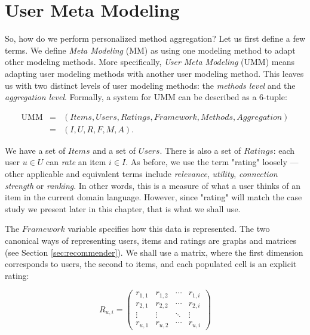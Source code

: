 \section{User Meta Modeling}

So, how do we perform personalized method aggregation?
Let us first define a few terms.
We define \emph{Meta Modeling} (MM) as using one modeling method to adapt other modeling methods.
More specifically, \emph{User Meta Modeling} (UMM) means adapting user modeling methods with another user modeling method.
This leaves us with two distinct levels of user modeling methods: the \emph{methods level} and the \emph{aggregation level}.
Formally, a system for UMM can be described as a 6-tuple:

\begin{eqnarray*}
  \mathrm{UMM} &=& (Items, Users, Ratings, Framework, Methods, Aggregation)\\
               &=& (I,U,R,F,M,A).
\end{eqnarray*}

We have a set of $Items$ and a set of $Users$.
There is also a set of $Ratings$: each user $u \in U$ can \emph{rate} an item $i \in I$.
As before, we use the term "rating" loosely --- other applicable and equivalent terms include \emph{relevance}, \emph{utility},
\emph{connection strength} or \emph{ranking}. In other words, this is a measure of what a user thinks of an item
in the current domain language. However, since "rating" will match the case study we present later in this chapter,
that is what we shall use. 

The $Framework$ variable specifies how this data is represented.
The two canonical ways of representing users, items and ratings are graphs and matrices (see Section \ref{sec:recommender}).
We shall use a matrix, where the first dimension corresponds to users, the second to items, and each populated cell is an explicit rating:

\begin{equation*}
 R_{u,i} =
 \begin{pmatrix}
  r_{1,1} & r_{1,2} & \cdots & r_{1,i} \\
  r_{2,1} & r_{2,2} & \cdots & r_{2,i} \\
  \vdots  & \vdots  & \ddots & \vdots  \\
  r_{u,1} & r_{u,2} & \cdots & r_{u,i}
 \end{pmatrix}
\end{equation*}

